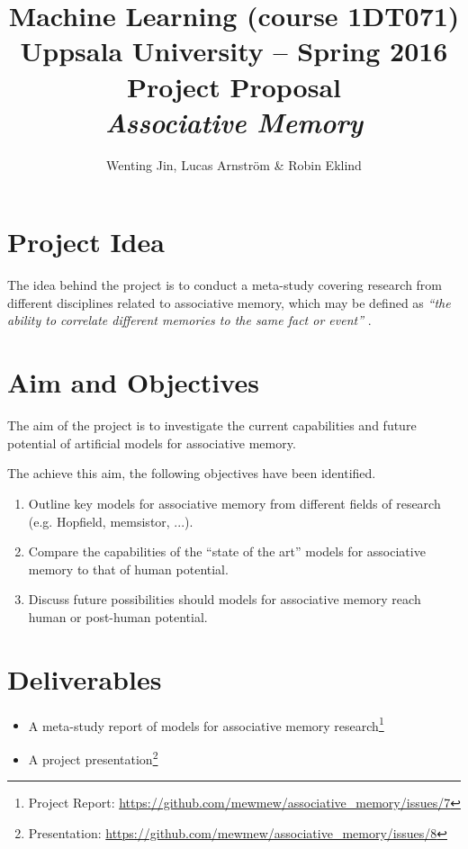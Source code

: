 \documentclass[12pt, a4paper]{article}
\title{\textbf{Machine Learning (course 1DT071) \\
    Uppsala University -- Spring 2016 \\
    Project Proposal \\
    \textit{Associative Memory}
  }
}
\author{Wenting Jin, Lucas Arnström \& Robin Eklind}
\begin{document}
\maketitle



\section{Project Idea} %



The idea behind the project is to conduct a meta-study covering research from different disciplines related to associative memory, which may be defined as \textit{``the ability to correlate different memories to the same fact or event''} \cite{memsistor}.

\section{Aim and Objectives}

The aim of the project is to investigate the current capabilities and future potential of artificial models for associative memory.

The achieve this aim, the following objectives have been identified.

\begin{enumerate}
	\item Outline key models for associative memory from different fields of research (e.g. Hopfield, memsistor, ...).
	\item Compare the capabilities of the ``state of the art'' models for associative memory to that of human potential.
	\item Discuss future possibilities should models for associative memory reach human or post-human potential.
\end{enumerate}

\section{Deliverables}

\begin{itemize}
	\item A meta-study report of models for associative memory research\footnote{Project Report: \url{https://github.com/mewmew/associative_memory/issues/7}}
	\item A project presentation\footnote{Presentation: \url{https://github.com/mewmew/associative_memory/issues/8}}
\end{itemize}
\end{document}
